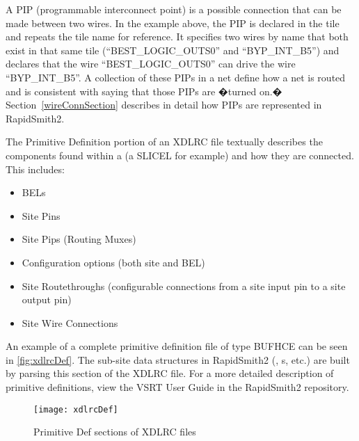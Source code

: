 \noindent
A PIP (programmable interconnect point) is a possible connection that can be
made between two wires. In the example above, the PIP is declared in the tile
and repeats the tile name for reference. It specifies two wires by name that
both exist in that same tile (``BEST\_LOGIC\_OUTS0'' and ``BYP\_INT\_B5'') and
declares that the wire ``BEST\_LOGIC\_OUTS0'' can drive the wire
``BYP\-\_INT\_B5''. A collection of these PIPs in a net define how a net is
routed and is consistent with saying that those PIPs are �turned on.�
Section~\ref{wireConnSection} describes in detail how PIPs are represented in
RapidSmith2.

\bigbreak \noindent
\begin{large}
\end{large}

\bigbreak \noindent
The Primitive Definition portion of an XDLRC file textually describes the
components found within a   (a SLICEL for example)
and how they are connected. This includes: 

\begin{itemize}
  \item BELs
  \item Site Pins 
  \item Site Pips (Routing Muxes) 
  \item Configuration options (both site and BEL)
  \item Site Routethroughs (configurable connections from a site input pin to
  a site output pin)
  \item Site Wire Connections
\end{itemize}

\noindent An example of a complete primitive definition file of type BUFHCE can
be seen in \autoref{fig:xdlrcDef}. The sub-site data structures in RapidSmith2
(, s, etc.) are built by parsing this section of the
XDLRC file. For a more detailed description of primitive definitions, view the
VSRT User Guide in the RapidSmith2 repository.

\begin{figure}[t!]
	\centering
	\texttt{[image: xdlrcDef]}
	\caption{Primitive Def sections of XDLRC files}
	\label{fig:xdlrcDef}
\end{figure}


